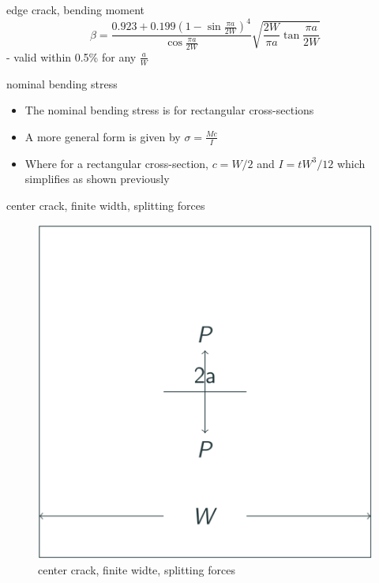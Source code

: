 \documentclass[
  letterpaper,
  ignorenonframetext,
  aspectratio=43,
  handout,
  12pt]{beamer}
\providecommand{\tightlist}{%
  \setlength{\itemsep}{0pt}\setlength{\parskip}{0pt}}
\providecommand{\tightlist}{%
\setlength{\itemsep}{0pt}\setlength{\parskip}{0pt}}
\let\Oldincludegraphics\includegraphics
\renewcommand{\includegraphics}[2][]{\Oldincludegraphics[width=\textwidth,height=0.7\textheight,keepaspectratio]{#2}}
\begin{document}
\begin{frame}{edge crack, bending moment}
\protect\hypertarget{edge-crack-bending-moment-2}{}
\[\beta = \frac{0.923 + 0.199 \left(1-\sin \frac{\pi a}{2W}\right)^4}{\cos \frac{\pi a}{2W}}\sqrt{\frac{2W}{\pi a} \tan \frac{\pi a}{2W}}\]
- valid within 0.5\% for any \(\frac{a}{W}\)
\end{frame}

\begin{frame}{nominal bending stress}
\protect\hypertarget{nominal-bending-stress}{}
\begin{itemize}
\tightlist
\item
  The nominal bending stress is for rectangular cross-sections
\item
  A more general form is given by \(\sigma = \frac{Mc}{I}\)
\item
  Where for a rectangular cross-section, \(c=W/2\) and \(I=tW^3/12\)
  which simplifies as shown previously
\end{itemize}
\end{frame}

\begin{frame}{center crack, finite width, splitting forces}
\protect\hypertarget{center-crack-finite-width-splitting-forces}{}
\begin{figure}
\centering
\includegraphics{../images/splitting-force.svg}
\caption{center crack, finite widte, splitting forces}
\end{figure}
\end{frame}
\end{document}
